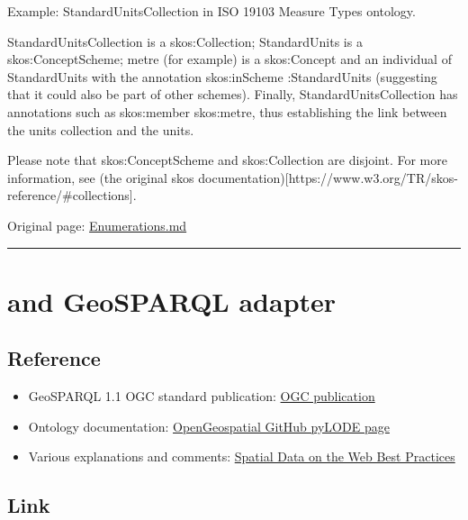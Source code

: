 \documentclass[
  11pt,
]{article}
\providecommand{\tightlist}{%
  \setlength{\itemsep}{0pt}\setlength{\parskip}{0pt}}
\begin{document}
Example: StandardUnitsCollection in ISO 19103 Measure Types ontology.

StandardUnitsCollection is a skos:Collection; StandardUnits is a
skos:ConceptScheme; metre (for example) is a skos:Concept and an
individual of StandardUnits with the annotation skos:inScheme
:StandardUnits (suggesting that it could also be part of other schemes).
Finally, StandardUnitsCollection has annotations such as skos:member
skos:metre, thus establishing the link between the units collection and
the units.

Please note that skos:ConceptScheme and skos:Collection are disjoint.
For more information, see (the original skos
documentation){[}https://www.w3.org/TR/skos-reference/\#collections{]}.

Original page:
\href{https://github.com/UICrail/CDM-RSM/wiki/Enumerations}{Enumerations.md}

\begin{center}\rule{0.5\linewidth}{0.5pt}\end{center}

\hypertarget{and-geosparql-adapter}{%
\section{and GeoSPARQL adapter}\label{and-geosparql-adapter}}

\hypertarget{reference}{%
\subsection{Reference}\label{reference}}

\begin{itemize}
\tightlist
\item
  GeoSPARQL 1.1 OGC standard publication:
  \href{https://docs.ogc.org/is/22-047r1/22-047r1.html}{OGC publication}
\item
  Ontology documentation:
  \href{https://opengeospatial.github.io/ogc-geosparql/geosparql11/index.html}{OpenGeospatial
  GitHub pyLODE page}
\item
  Various explanations and comments:
  \href{https://w3c.github.io/sdw/bp/}{Spatial Data on the Web Best
  Practices}
\end{itemize}

\hypertarget{link}{%
\subsection{Link}\label{link}}
\end{document}
